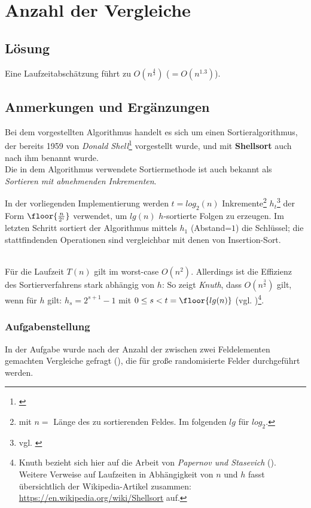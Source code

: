 \chapter{Anzahl der Vergleiche}

\section*{Lösung}

Eine Laufzeitabschätzung führt zu $O(n^{\frac{4}{3}})$ ($ = O(n^{1.3})$).


\section*{Anmerkungen und Ergänzungen}

Bei dem vorgestellten Algorithmus handelt es sich um einen Sortieralgorithmus, der bereits 1959 von \textit{Donald Shell}\footnote{
\cite[]{She59}
} vorgestellt wurde, und mit \textbf{Shellsort} auch nach ihm benannt wurde.\\

Die in dem Algorithmus verwendete Sortiermethode ist auch bekannt als \textit{Sortieren mit abnehmenden Inkrementen}\cite[88]{OW17b}.

In der vorliegenden Implementierung werden $t = log_2(n)$  Inkremente\footnote{
    mit $n =$ Länge des zu sortierenden Feldes. Im folgenden $lg$ für $log_2$.
} $h_t$\footnote{
vgl. \cite[84]{Knu97b}
} der Form $\floor{\frac{n}{2^i}}$ verwendet, um $lg(n)$ $h$-sortierte Folgen zu erzeugen.
Im letzten Schritt sortiert der Algorithmus mittels $h_1$ (Abstand=$1$) die Schlüssel; die stattfindenden Operationen sind vergleichbar mit denen von Insertion-Sort.

\\
Für die Laufzeit $T(n)$ gilt im worst-case $O(n^2)$.
Allerdings ist die Effizienz des Sortierverfahrens stark abhängig von $h$: So zeigt \textit{Knuth}, dass $O(n^{\frac{3}{2}})$ gilt, wenn für $h$ gilt: $h_s = 2^{s+1} - 1$ mit $0 \leq s < t = \floor{lg(n)}$ (vgl. \cite[91]{Knu97b})\footnote{
Knuth bezieht sich hier auf die Arbeit von \textit{Papernov und Stasevich} (\cite[]{PS65}).
Weitere Verweise auf Laufzeiten in Abhängigkeit von $n$ und $h$ fasst übersichtlich der Wikipedia-Artikel zusammen: \url{https://en.wikipedia.org/wiki/Shellsort} auf.
}.
\\
\subsection*{Aufgabenstellung}
In der Aufgabe wurde nach der Anzahl der zwischen zwei Feldelementen gemachten Vergleiche gefragt (), die für große randomisierte Felder durchgeführt werden.

